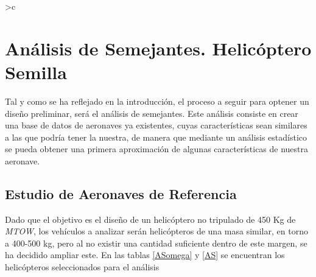 \thispagestyle{empty}
\newcolumntype{g} {>{}c}
\chapter{Análisis de Semejantes. Helicóptero Semilla}


Tal y como se ha reflejado en la introducción, el proceso a seguir para optener un diseño preliminar, será el análisis de semejantes.
Este análisis consiste en crear una base de datos de aeronaves ya existentes, cuyas características sean similares a las que podría tener la nuestra, de manera que mediante un análisis estadístico se pueda obtener una primera aproximación de algunas características de nuestra aeronave.\\

\section{Estudio de Aeronaves de Referencia}

Dado que el objetivo es el diseño de un helicóptero no tripulado de 450 Kg de \emph{MTOW}, los vehículos a analizar serán helicópteros de una masa similar, en torno a 400-500 kg, pero al no existir una cantidad suficiente dentro de este margen, se ha decidido ampliar este.
En las tablas \ref{ASomega} y \ref{AS} se encuentran los helicópteros seleccionados para el análisis

